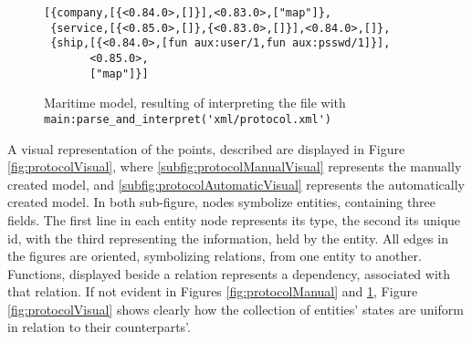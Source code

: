 \begin{figure}[h]
  \begin{lstlisting}[keywordstyle={}]
[{company,[{<0.84.0>,[]}],<0.83.0>,["map"]},
 {service,[{<0.85.0>,[]},{<0.83.0>,[]}],<0.84.0>,[]},
 {ship,[{<0.84.0>,[fun aux:user/1,fun aux:psswd/1]}],
       <0.85.0>,
       ["map"]}]
  \end{lstlisting}
  \caption{Maritime model, resulting of interpreting the file  with \lstinline{main:parse_and_interpret('xml/protocol.xml')}}
  \label{fig:protocolAutomatic}
\end{figure}

\noindent
A visual representation of the points, described are displayed in Figure \ref{fig:protocolVisual}, where \ref{subfig:protocolManualVisual} represents the manually created model, and \ref{subfig:protocolAutomaticVisual} represents the automatically created model. In both sub-figure, nodes symbolize entities, containing three fields. The first line in each entity node represents its type, the second its unique id, with the third representing the information, held by the entity. All edges in the figures are oriented, symbolizing relations, from one entity to another. Functions, displayed beside a relation represents a dependency, associated with that relation. If not evident in Figures \ref{fig:protocolManual} and \ref{fig:protocolAutomatic}, Figure \ref{fig:protocolVisual} shows clearly how the collection of entities' states are uniform in relation to their counterparts'.

